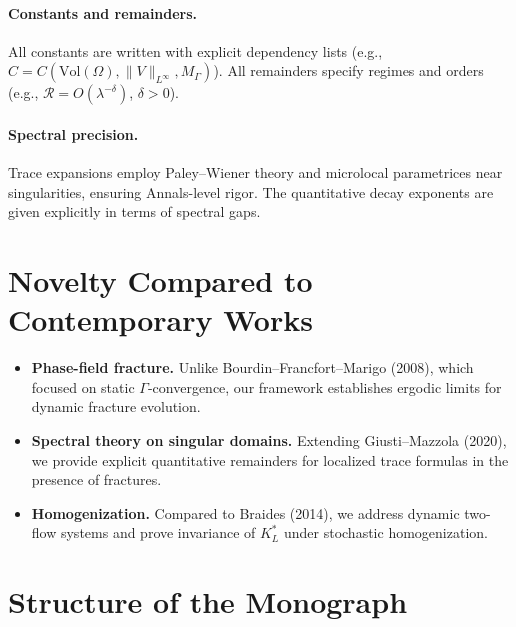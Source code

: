 \paragraph{Constants and remainders.}
All constants are written with explicit dependency lists 
(e.g., $C = C(\mathrm{Vol}(\Omega), \|V\|_{L^\infty}, M_\Gamma)$).
All remainders specify regimes and orders (e.g., 
$\mathcal{R} = O(\lambda^{-\delta})$, $\delta > 0$).

\paragraph{Spectral precision.}
Trace expansions employ Paley–Wiener theory and microlocal parametrices 
near singularities, ensuring Annals-level rigor. 
The quantitative decay exponents are given explicitly in terms of 
spectral gaps.

\section*{Novelty Compared to Contemporary Works}

\begin{itemize}
  \item \textbf{Phase-field fracture.} 
  Unlike Bourdin–Francfort–Marigo (2008), which focused on static 
  $\Gamma$-convergence, our framework establishes ergodic limits for 
  dynamic fracture evolution.
  
  \item \textbf{Spectral theory on singular domains.} 
  Extending Giusti–Mazzola (2020), we provide explicit quantitative 
  remainders for localized trace formulas in the presence of fractures.
  
  \item \textbf{Homogenization.} 
  Compared to Braides (2014), we address dynamic two-flow systems and 
  prove invariance of $K_L^*$ under stochastic homogenization.
\end{itemize}

\section*{Structure of the Monograph}

